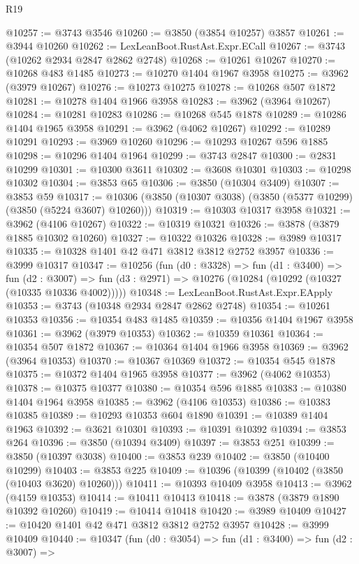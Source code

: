 \begin{lexlean}{R19}
\begin{coremodule}
@10257 := @3743 @3546
@10260 := @3850 (@3854 @10257) @3857
@10261 := @3944 @10260
@10262 := LexLeanBoot.RustAst.Expr.ECall
@10267 := @3743 (@10262 @2934 @2847 @2862 @2748)
@10268 := @10261 @10267
@10270 := @10268 @483 @1485
@10273 := @10270 @1404 @1967 @3958
@10275 := @3962 (@3979 @10267)
@10276 := @10273 @10275
@10278 := @10268 @507 @1872
@10281 := @10278 @1404 @1966 @3958
@10283 := @3962 (@3964 @10267)
@10284 := @10281 @10283
@10286 := @10268 @545 @1878
@10289 := @10286 @1404 @1965 @3958
@10291 := @3962 (@4062 @10267)
@10292 := @10289 @10291
@10293 := @3969 @10260
@10296 := @10293 @10267 @596 @1885
@10298 := @10296 @1404 @1964
@10299 := @3743 @2847
@10300 := @2831 @10299
@10301 := @10300 @3611
@10302 := @3608 @10301
@10303 := @10298 @10302
@10304 := @3853 @65
@10306 := @3850 (@10304 @3409)
@10307 := @3853 @59
@10317 := @10306 (@3850 (@10307 @3038) (@3850 (@5377 @10299) (@3850 (@5224 @3607) @10260)))
@10319 := @10303 @10317 @3958
@10321 := @3962 (@4106 @10267)
@10322 := @10319 @10321
@10326 := @3878 (@3879 @1885 @10302 @10260)
@10327 := @10322 @10326
@10328 := @3989 @10317
@10335 := @10328 @1401 @42 @471 @3812 @3812 @2752 @3957
@10336 := @3999 @10317
@10347 := @10256
    (fun (d0 : @3328) =>
    fun (d1 : @3400) =>
    fun (d2 : @3007) => fun (d3 : @2971) => @10276 (@10284 (@10292 (@10327 (@10335 @10336 @4002)))))
@10348 := LexLeanBoot.RustAst.Expr.EApply
@10353 := @3743 (@10348 @2934 @2847 @2862 @2748)
@10354 := @10261 @10353
@10356 := @10354 @483 @1485
@10359 := @10356 @1404 @1967 @3958
@10361 := @3962 (@3979 @10353)
@10362 := @10359 @10361
@10364 := @10354 @507 @1872
@10367 := @10364 @1404 @1966 @3958
@10369 := @3962 (@3964 @10353)
@10370 := @10367 @10369
@10372 := @10354 @545 @1878
@10375 := @10372 @1404 @1965 @3958
@10377 := @3962 (@4062 @10353)
@10378 := @10375 @10377
@10380 := @10354 @596 @1885
@10383 := @10380 @1404 @1964 @3958
@10385 := @3962 (@4106 @10353)
@10386 := @10383 @10385
@10389 := @10293 @10353 @604 @1890
@10391 := @10389 @1404 @1963
@10392 := @3621 @10301
@10393 := @10391 @10392
@10394 := @3853 @264
@10396 := @3850 (@10394 @3409)
@10397 := @3853 @251
@10399 := @3850 (@10397 @3038)
@10400 := @3853 @239
@10402 := @3850 (@10400 @10299)
@10403 := @3853 @225
@10409 := @10396 (@10399 (@10402 (@3850 (@10403 @3620) @10260)))
@10411 := @10393 @10409 @3958
@10413 := @3962 (@4159 @10353)
@10414 := @10411 @10413
@10418 := @3878 (@3879 @1890 @10392 @10260)
@10419 := @10414 @10418
@10420 := @3989 @10409
@10427 := @10420 @1401 @42 @471 @3812 @3812 @2752 @3957
@10428 := @3999 @10409
@10440 := @10347
    (fun (d0 : @3054) =>
    fun (d1 : @3400) =>
    fun (d2 : @3007) =>

\end{coremodule}
\end{lexlean}
